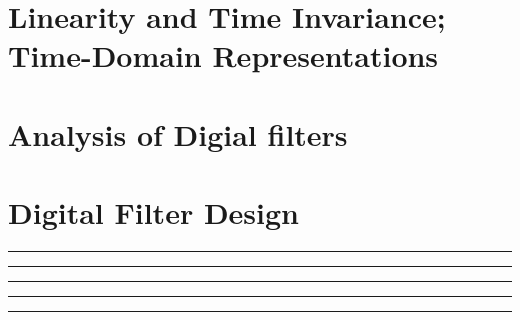 \documentclass[10pt]{article}
\begin{document}
\newcommand{\josquote}[1]{
    \framebox{
    \parbox{\textwidth}{
    \textit{#1}
    }
    }
}

\newcommand{\paulhint}[1]{
    #1
}

\setlength\parindent{0pt}
\section{Linearity and Time Invariance; Time-Domain Representations}
%
%
%
%
%
\section{Analysis of Digial filters}
%
%
%
%
%
\section{Digital Filter Design}

\noindent\rule[0.5ex]{\linewidth}{0.5pt}

\noindent\rule[0.5ex]{\linewidth}{0.5pt}

\noindent\rule[0.5ex]{\linewidth}{0.5pt}

\noindent\rule[0.5ex]{\linewidth}{0.5pt}

\noindent\rule[0.5ex]{\linewidth}{0.5pt}

\end{document}
